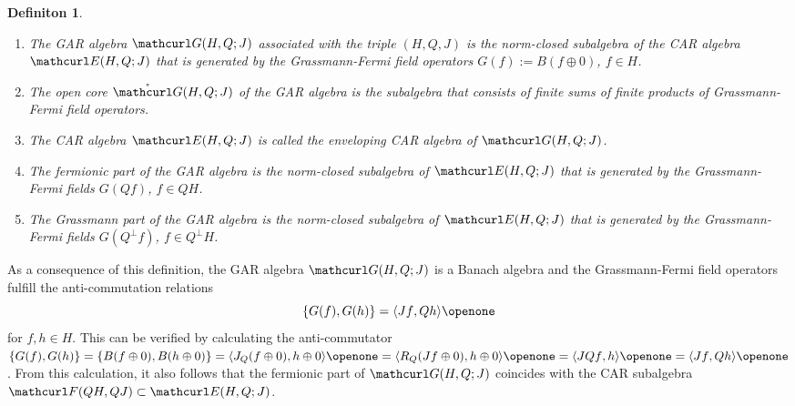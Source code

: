 \documentclass[pra,twoside,amsmath,amsfonts,amssymb,superscriptaddress,showpacs]{revtex4}
\newtheorem{defi}[thm]{Definiton}
\def\9#1{{\mathcurl #1}}
\def\I{\openone}
\newcommand{\CAR}[2]{\9F(#1,#2)}
\newcommand{\SPROD}[2]{\langle{#1},{#2}\rangle}
\newcommand{\GAR}[3]{\9G(#1,#3;#2)}
\newcommand{\PGAR}[3]{\mathring{\9G}(#1,#3;#2)}
\newcommand{\ACO}[2]{\{#1,#2\}}
\newcommand{\ENV}[3]{\9E(#1,#3;#2)}
\begin{document}
\begin{defi}\em
\begin{enumerate}
\item
The {\em GAR algebra} $\GAR{H}{J}{Q}$ associated with the triple $(H,Q,J)$ is the norm-closed
subalgebra of the CAR algebra $\ENV{H}{J}{Q}$ that is generated by the {\em Grassmann-Fermi field
operators} $G(f):=B(f\oplus 0)$, $f\in H$.

\item
The {\em open core} $\PGAR{H}{J}{Q}$ of the GAR algebra is the subalgebra that consists of finite
sums of finite products of Grassmann-Fermi field operators.

\item
The CAR algebra $\ENV{H}{J}{Q}$ is called the {\em enveloping CAR algebra} of $\GAR{H}{J}{Q}$. 

\item
The {\em fermionic part} of the GAR algebra is the norm-closed subalgebra of $\ENV{H}{J}{Q}$ that
is generated by the Grassmann-Fermi fields $G(Qf)$, $f\in QH$. 

\item
The {\em Grassmann part} of the GAR algebra is the norm-closed subalgebra of $\ENV{H}{J}{Q}$ that 
is generated by the Grassmann-Fermi fields $G(Q^\perp f)$, $f\in Q^\perp H$. 
\end{enumerate}
\end{defi}

As a consequence of this definition, the GAR algebra $\GAR{H}{J}{Q}$ is a Banach algebra and the
Grassmann-Fermi field operators fulfill
the anti-commutation relations
\begin{equation}
\ACO{G(f)}{G(h)}=\SPROD{Jf}{Qh}\I \\
\end{equation}
for $f,h\in H$. This can be verified by calculating the anti-commutator
$\ACO{G(f)}{G(h)}=\ACO{B(f\oplus 0)}{B(h\oplus
0)}=\SPROD{J_Q(f\oplus 0)}{h\oplus 0}\I=\SPROD{R_Q(Jf\oplus 0)}{h\oplus
0}\I=\SPROD{JQf}{h}\I=\SPROD{Jf}{Qh}\I$. From this calculation, it also follows that 
the fermionic part of $\GAR{H}{J}{Q}$ coincides with the CAR subalgebra
$\CAR{QH}{QJ}\subset\ENV{H}{J}{Q}$.
\end{document}

